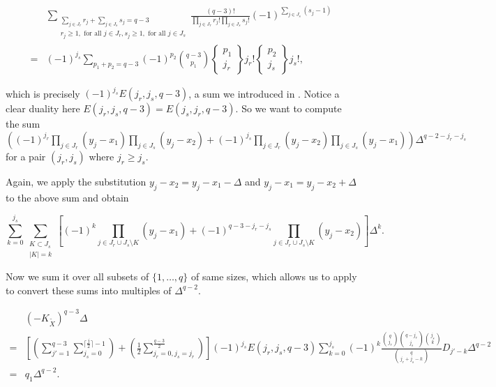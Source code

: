 \documentclass[11pt]{article}
\begin{document}
\begin{align*}
    &\sum_{\substack{\sum_{j\in J_r}r_j + \sum_{j\in J_s}s_j=q-3\\ r_j\geq 1, \text{ for all } j\in J_r, s_j\geq 1, \text{ for all } j\in J_s}}\frac{(q-3)!}{\prod_{j\in J_r}r_j!\prod_{j\in J_s}s_j!}(-1)^{\sum_{j\in J_s}(s_j - 1)} \\ 
    =& (-1)^{j_s}\sum_{p_1 + p_2 = q-3}(-1)^{p_2}\binom{q-3}{p_1}\begin{Bmatrix}
        p_1\\ 
        j_r
    \end{Bmatrix}j_r!\begin{Bmatrix}
        p_2\\ 
        j_s
    \end{Bmatrix}j_s!,
\end{align*}

which is precisely \((-1)^{j_s}E(j_r, j_s, q-3)\), a sum we introduced in . Notice a clear duality here \(E(j_r, j_s, q-3) = E(j_s, j_r, q-3)\). So we want to compute the sum \(((-1)^{j_r}\prod_{j\in J_r}(y_j - x_1)\prod_{j\in J_s}(y_j - x_2) + (-1)^{j_s}\prod_{j\in J_r}(y_j - x_2)\prod_{j\in J_s}(y_j - x_1))\Delta^{q-2-j_r-j_s}\) for a pair \((j_r, j_s)\) where \(j_r\geq j_s\). 

Again, we apply the substitution \(y_j - x_2 = y_j - x_1 - \Delta\) and \(y_j - x_1 = y_j - x_2 + \Delta\) to the above sum and obtain 

\[
\sum_{k = 0}^{j_s}\sum_{\substack{K\subset J_s\\ |K|=k}}\left[(-1)^k\prod_{j\in J_r\cup J_s\setminus K}(y_j - x_1) + (-1)^{q-3-j_r-j_s}\prod_{j\in J_r\cup J_s\setminus K}(y_j - x_2)\right]\Delta^k.
\]

Now we sum it over all subsets of \(\{1, \dots, q\}\) of same sizes, which allows us to apply  to convert these sums into multiples of \(\Delta^{q-2}\).

\begin{align*}
    &(-K_{\tilde{X}})^{q-3}\Delta \\ 
    =&\left[\left(\sum_{j' = 1}^{q-3}\sum_{j_s = 0}^{\lceil \frac{j}{2} \rceil - 1}\right) + \left(\frac{1}{2}\sum_{j_r = 0, j_s = j_r}^{\frac{q-3}{2}}\right)\right] (-1)^{j_s}E(j_r, j_s, q-3)\sum_{k = 0}^{j_s}(-1)^k\frac{\binom{q}{j_r}\binom{q-j_r}{j_s}\binom{j_s}{k}}{\binom{q}{j_r + j_s - k}}D_{j'-k}\Delta^{q-2}\\ 
    =& q_1\Delta^{q-2}.
\end{align*}
\end{document}
